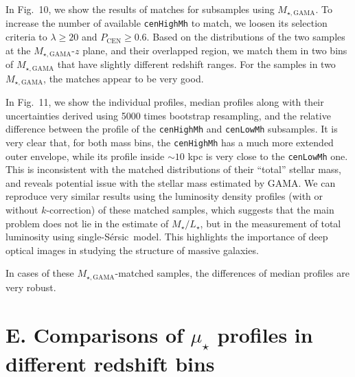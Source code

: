 \documentclass{emulateapj}
\def\ser{{S\'{e}rsic\ }}
\def\rbcg{\texttt{cenHighMh}}
\def\nbcg{\texttt{cenLowMh}}
\def\m2l{{$M_{\star}/L_{\star}$}}
\def\mden{{$\mu_{\star}$}}
\begin{document}
\begin{CJK*}{UTF8}{gbsn}
    
    In Fig.~10, we show the results of matches for subsamples using 
    $M_{\star, \mathrm{GAMA}}$.  
    To increase the number of available \rbcg{} to match, we loosen 
    its selection criteria to $\lambda \ge 20$ and $P_{\mathrm{CEN}} \ge 0.6$.
    Based on the distributions of the two samples at the $M_{\star, \mathrm{GAMA}}$-$z$ 
    plane, and their overlapped region, we match them in two bins of 
    $M_{\star, \mathrm{GAMA}}$ that have slightly different redshift ranges. 
    For the samples in two $M_{\star, \mathrm{GAMA}}$, the matches appear to be
    very good.  
    
    In Fig.~11, we show the individual profiles, median profiles along with their 
    uncertainties derived using 5000 times bootstrap resampling, and the relative 
    difference between the profile of the \rbcg{} and \nbcg{} 
    subsamples.  
    It is very clear that, for both mass bins, the \rbcg{} has a much 
    more extended outer envelope, while its profile inside $\sim 10$ kpc is 
    very close to the \nbcg{} one.  
    This is inconsistent with the matched distributions of their ``total'' 
    stellar mass, and reveals potential issue with the stellar mass estimated 
    by GAMA.
    We can reproduce very similar results using the luminosity density profiles 
    (with or without $k$-correction) of these matched samples, which suggests 
    that the main problem does not lie in the estimate of \m2l{}, but in the 
    measurement of total luminosity using single-\ser model.  
    This highlights the importance of deep optical images in studying the 
    structure of massive galaxies. 
    
        In cases of these $M_{\star, \mathrm{GAMA}}$-matched samples, the differences
    of median profiles are very robust. 


\section{E. Comparisons of \mden{} profiles in different redshift bins}
    \label{app:D}


\end{CJK*}
\end{document}
